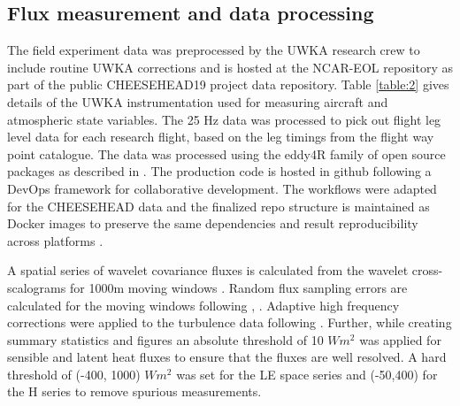 \documentclass[draft]{agujournal2019}
\begin{document}
\subsection{Flux measurement and data processing}

The field experiment data was preprocessed by the UWKA research crew to include routine UWKA corrections and is hosted at the NCAR-EOL repository as part of the public CHEESEHEAD19 project data repository\cite{french_university_2021}. Table \ref{table:2} gives details of the UWKA instrumentation used for measuring aircraft and atmospheric state variables.  The 25 Hz data was processed to pick out flight leg level data for each research flight, based on the leg timings from the flight way point catalogue.  The data was  processed using the eddy4R  family of open source packages as described in . The production code is hosted in github following a DevOps framework for collaborative development. The workflows were adapted for the CHEESEHEAD data and the finalized repo structure is maintained as Docker images to preserve the same dependencies and result reproducibility across platforms \cite{metzger_eddy4r_2017}.

A spatial series of wavelet covariance fluxes is calculated from the wavelet cross-scalograms for 1000m moving windows \cite{metzger_spatially_2013}. Random flux sampling errors are calculated for the moving windows following , . Adaptive high frequency corrections were applied to the turbulence data following \cite{nordbo_wavelet-based_2013}. Further, while creating summary statistics and figures an absolute threshold of 10 $W m^{2}$ was applied for sensible and latent heat fluxes to ensure that the fluxes are well resolved. A hard threshold of (-400, 1000) $W m^{2}$ was set for the LE space series and (-50,400) for the H series to remove spurious measurements. 
\end{document}
